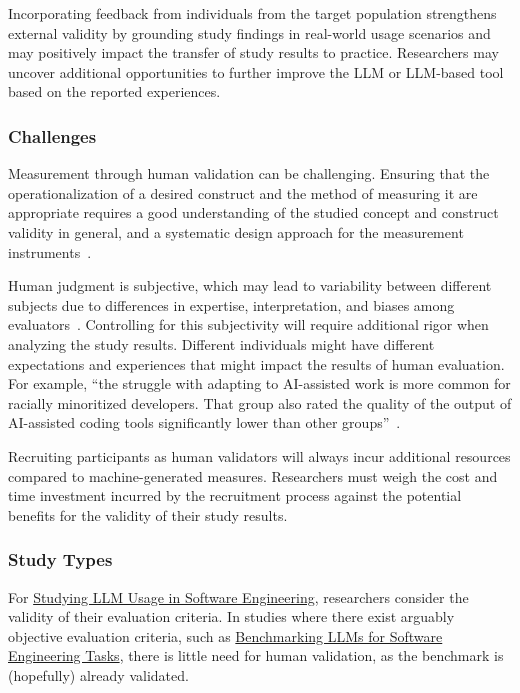 Incorporating feedback from individuals from the target population strengthens external validity by grounding study findings in real-world usage scenarios and may positively impact the transfer of study results to practice.
Researchers may uncover additional opportunities to further improve the LLM or LLM-based tool based on the reported experiences.

\subsubsection{Challenges}

Measurement through human validation can be challenging.
Ensuring that the operationalization of a desired construct and the method of measuring it are appropriate requires a good understanding of the studied concept and construct validity in general, and a systematic design approach for the measurement instruments~\cite{DBLP:journals/tse/SjobergB23}.

Human judgment is subjective, which may lead to variability between different subjects due to differences in expertise, interpretation, and biases among evaluators~\cite{DBLP:journals/pacmhci/McDonaldSF19}.
Controlling for this subjectivity will require additional rigor when analyzing the study results.
Different individuals might have different expectations and experiences that might impact the results of human evaluation. For example, \enquote{the struggle with adapting to AI-assisted work is more common for racially minoritized developers. That group also rated the quality of the output of AI-assisted coding tools significantly lower than other groups}~\cite{hicks_lee_foster-marks_2025}.

Recruiting participants as human validators will always incur additional resources compared to machine-generated measures.
Researchers must weigh the cost and time investment incurred by the recruitment process against the potential benefits for the validity of their study results.

\subsubsection{Study Types}

For \href{/study-types/#studying-llm-usage-in-software-engineering}{Studying LLM Usage in Software Engineering}, researchers \should consider the validity of their evaluation criteria.
In studies where there exist arguably objective evaluation criteria, such as \href{/study-types/#benchmarking-llms-for-software-engineering-tasks}{Benchmarking LLMs for Software Engineering Tasks}, there is little need for human validation, as the benchmark is (hopefully) already validated.

